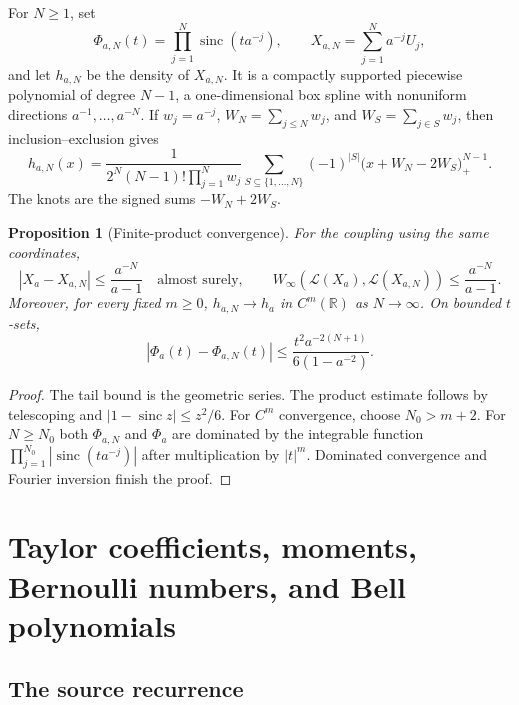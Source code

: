 \documentclass[11pt,oneside]{article}
\newtheorem{proposition}[theorem]{Proposition}
\theoremstyle{definition}
\theoremstyle{remark}
\newcommand{\R}{\mathbb R}
\newcommand{\sinc}{\operatorname{sinc}}
\newcommand{\Wass}{W_{\infty}}
\begin{document}
For $N\ge1$, set
\begin{equation}
 \Phi_{a,N}(t)=\prod_{j=1}^{N}\sinc(ta^{-j}),
 \qquad
 X_{a,N}=\sum_{j=1}^{N}a^{-j}U_j,
 \label{eq:finite-products}
\end{equation}
and let $h_{a,N}$ be the density of $X_{a,N}$.  It is a compactly supported piecewise
polynomial of degree $N-1$, a one-dimensional box spline with nonuniform directions
$a^{-1},\ldots,a^{-N}$.  If $w_j=a^{-j}$, $W_N=\sum_{j\le N}w_j$, and
$W_S=\sum_{j\in S}w_j$, then inclusion--exclusion gives
\begin{equation}
 h_{a,N}(x)=\frac1{2^N(N-1)!\prod_{j=1}^{N}w_j}
 \sum_{S\subseteq\{1,\ldots,N\}}(-1)^{|S|}
 \bigl(x+W_N-2W_S\bigr)_+^{N-1}.
 \label{eq:finite-box-spline}
\end{equation}
The knots are the signed sums $-W_N+2W_S$.

\begin{proposition}[Finite-product convergence]
\label{prop:finite-convergence}
For the coupling using the same coordinates,
\begin{equation}
 |X_a-X_{a,N}|\le\frac{a^{-N}}{a-1}
 \quad\text{almost surely},
 \qquad
 \Wass(\mathcal L(X_a),\mathcal L(X_{a,N}))
 \le\frac{a^{-N}}{a-1}.
 \label{eq:Wasserstein-finite}
\end{equation}
Moreover, for every fixed $m\ge0$, $h_{a,N}\to h_a$ in $C^m(\R)$ as $N\to\infty$.
On bounded $t$-sets,
\begin{equation}
 |\Phi_a(t)-\Phi_{a,N}(t)|
 \le \frac{t^2a^{-2(N+1)}}{6(1-a^{-2})}.
 \label{eq:finite-product-rate}
\end{equation}
\end{proposition}

\begin{proof}
The tail bound is the geometric series.  The product estimate follows by telescoping and
$|1-\sinc z|\le z^2/6$.  For $C^m$ convergence, choose $N_0>m+2$.  For $N\ge N_0$ both
$\Phi_{a,N}$ and $\Phi_a$ are dominated by the integrable function
$\prod_{j=1}^{N_0}|\sinc(ta^{-j})|$ after multiplication by $|t|^m$.  Dominated convergence
and Fourier inversion finish the proof.
\end{proof}

\section{Taylor coefficients, moments, Bernoulli numbers, and Bell polynomials}
\label{sec:moments}

\subsection{The source recurrence}
\end{document}
